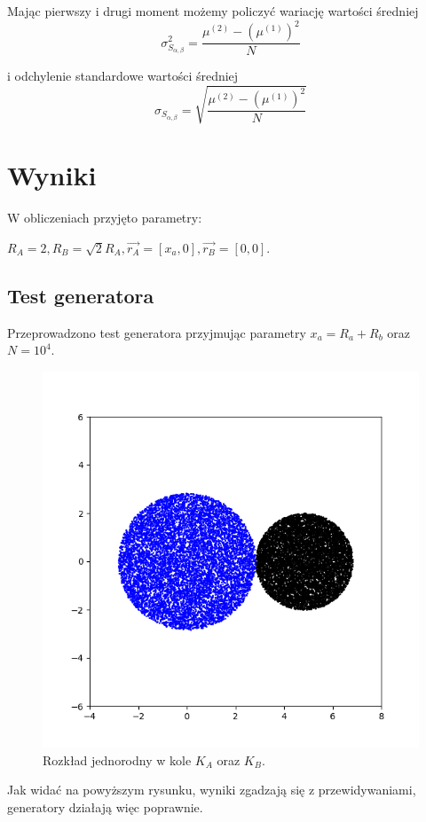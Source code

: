 \documentclass[a4paper,12pt,twoside]{article}
\begin{document}
Mając pierwszy i drugi moment możemy policzyć wariację wartości średniej
\begin{equation}
\sigma_{S_{\alpha,\beta}}^2 = \frac{\mu^{(2)} - \left(\mu^{(1)}\right)^2}{N}
\end{equation}

i odchylenie standardowe wartości średniej
\begin{equation}
\sigma_{S_{\alpha,\beta}} = \sqrt{ \frac{ \mu^{(2)} - \left( \mu^{(1)} \right)^2 }{N} }
\end{equation}

\newpage

\section{Wyniki}
W obliczeniach przyjęto parametry:

$R_A = 2, R_B = \sqrt{2}R_A, \vec{r_A} = [x_a, 0], \vec{r_B} = [0, 0]$. 

\subsection{Test generatora}

Przeprowadzono test generatora przyjmując parametry $x_a = R_a + R_b$ oraz $N = 10^4$. 

\begin{figure}[h!]
    \centering
    \includegraphics[width=0.65\linewidth]{Carlo_4_1.png}
    \caption{Rozkład jednorodny w kole $K_A$ oraz $K_B$.}
\end{figure}

Jak widać na powyższym rysunku, wyniki zgadzają się z przewidywaniami, generatory działają więc poprawnie.
\end{document}
